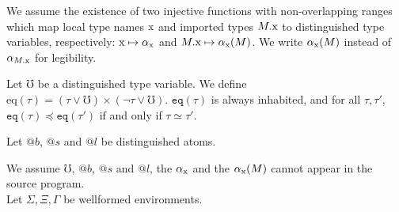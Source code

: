 \documentclass[12pt]{article}
\newcommand{\tx}{\text{\rm x}}
\newcommand{\Gammatop}{\ensuremath{\Xi}}
\newcommand{\Gammabot}{\ensuremath{\Gamma}}
\newcommand{\eq}{\texttt{eq}}
\begin{document}
We assume the existence of two injective functions with non-overlapping ranges
which map local type names $\tx$ and imported types $M.\tx$ to distinguished type variables, respectively:
$\tx \mapsto \alpha_\tx$ and $M.\tx \mapsto \alpha_\tx(M)$.
We write $\alpha_\tx(M)$ instead of $\alpha_{M.\tx}$ for legibility.

Let $\mho$ be a distinguished type variable. We define $\text{eq}(\tau) = (\tau \vee \mho) \times (\lnot \tau \vee \mho)$.
$\eq(\tau)$ is always inhabited, and for all $\tau, \tau'$, $\eq(\tau) \preceq \eq(\tau')$ if and only if $\tau \simeq \tau'$.

Let $@b$, $@s$ and $@l$ be distinguished atoms.

We assume $\mho$, $@b$, $@s$ and $@l$, the $\alpha_\tx$ and the $\alpha_\tx(M)$ cannot appear in the source program. \\

Let $\Sigma, \Gammatop, \Gammabot$ be wellformed environments.
\end{document}
